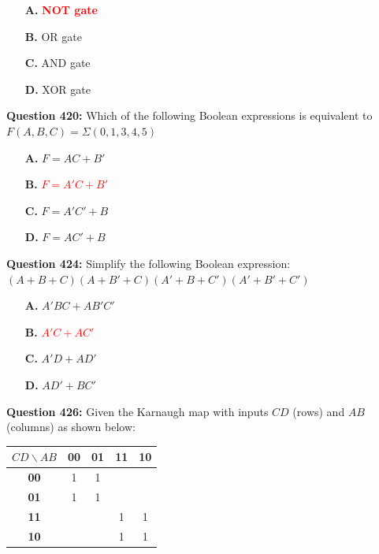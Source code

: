 \documentclass[12pt,a4paper]{article}
\begin{document}
\begin{itemize}
    \item[\textbf{A.}] \textcolor{red}{\textbf{NOT gate}}
    \item[\textbf{B.}] OR gate
    \item[\textbf{C.}] AND gate
    \item[\textbf{D.}] XOR gate
\end{itemize}

\vspace{0.5cm}

\vspace{0.5cm}

\textbf{Question 420:} Which of the following Boolean expressions is equivalent to $F(A, B, C) = \Sigma(0, 1, 3, 4, 5)$

\begin{itemize}
    \item[\textbf{A.}] $F = AC + B'$
    \item[\textbf{B.}] \textcolor{red}{\textbf{$F = A'C + B'$}}
    \item[\textbf{C.}] $F = A'C' + B$
    \item[\textbf{D.}] $F = AC' + B$
\end{itemize}

\vspace{0.5cm}

\vspace{0.5cm}

\textbf{Question 424:} \underline{\hspace{1.5cm}}Simplify the following Boolean expression: $(A + B + C)(A + B' + C)(A' + B + C')(A' + B' + C')$

\begin{itemize}
    \item[\textbf{A.}] $A'BC + AB'C'$
    \item[\textbf{B.}] \textcolor{red}{\textbf{$A'C + AC'$}}
    \item[\textbf{C.}] $A'D + AD'$
    \item[\textbf{D.}] $AD' + BC'$
\end{itemize}

\vspace{0.5cm}

\vspace{0.5cm}

\textbf{Question 426:} Given the Karnaugh map with inputs $CD$ (rows) and $AB$ (columns) as shown below:

\begin{center}
\renewcommand{\arraystretch}{1.4}
\begin{tabular}{|c|c|c|c|c|}
\hline
$CD \backslash AB$ & \textbf{00} & \textbf{01} & \textbf{11} & \textbf{10} \\ \hline
\textbf{00} & 1 & 1 & & \\ \hline
\textbf{01} & 1 & 1 & & \\ \hline
\textbf{11} & & & 1 & 1 \\ \hline
\textbf{10} & & & 1 & 1 \\ \hline
\end{tabular}
\end{center}
\end{document}
